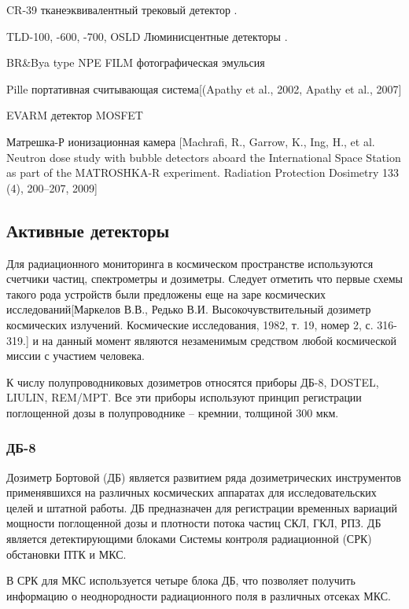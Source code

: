 CR-39 тканеэквивалентный трековый детектор \cite{Zhou2008}.


TLD-100, -600, -700, OSLD Люминисцентные детекторы \cite{Zhou2010}.


BR\&Bya type NPE FILM фотографическая эмульсия


Pille портативная считывающая система[(Apathy et al., 2002, Apathy et al., 2007]


EVARM детектор MOSFET 


Матрешка-Р ионизационная камера [Machrafi, R., Garrow, K., Ing, H., et al. Neutron dose study with bubble detectors aboard the International Space Station as part of the MATROSHKA-R experiment. Radiation Protection Dosimetry 133 (4), 200--207, 2009]



\subsection{Активные детекторы} \label{subsect1_3_2}

Для радиационного мониторинга в космическом пространстве используются счетчики частиц, спектрометры и дозиметры. Следует отметить что первые схемы такого рода устройств были предложены еще на заре космических исследований[Маркелов В.В., Редько В.И. Высокочувствительный дозиметр космических излучений. Космические исследования, 1982, т. 19, номер 2, с. 316-319.] и на данный момент являются незаменимым средством любой космической миссии с участием человека.

К числу полупроводниковых дозиметров относятся приборы ДБ-8, DOSTEL, LIULIN, REM/MPT. Все эти приборы используют принцип регистрации поглощенной дозы в полупроводнике – кремнии, толщиной 300 мкм.  

\subsubsection{ДБ-8}

Дозиметр Бортовой (ДБ) является развитием ряда дозиметрических инструментов применявшихся на различных космических аппаратах для исследовательских целей и штатной работы. ДБ предназначен для регистрации временных вариаций мощности поглощенной дозы и плотности потока частиц СКЛ, ГКЛ, РПЗ. ДБ является детектирующими блоками Системы контроля радиационной (СРК) обстановки ПТК и МКС.

В СРК для МКС используется четыре блока ДБ, что позволяет получить информацию о неоднородности радиационного поля в различных отсеках МКС. 

